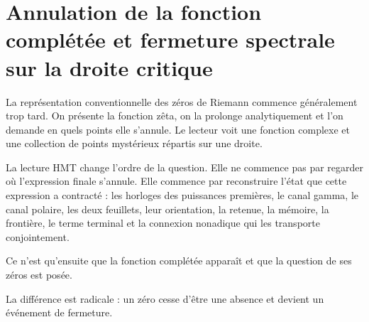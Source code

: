 \section{Annulation de la fonction complétée et fermeture spectrale sur la droite critique}
La représentation conventionnelle des zéros de Riemann commence généralement trop tard. On présente la fonction zêta, on la prolonge analytiquement et l’on demande en quels points elle s’annule. Le lecteur voit une fonction complexe et une collection de points mystérieux répartis sur une droite.\par
La lecture HMT change l’ordre de la question. Elle ne commence pas par regarder où l’expression finale s’annule. Elle commence par reconstruire l’état que cette expression a contracté : les horloges des puissances premières, le canal gamma, le canal polaire, les deux feuillets, leur orientation, la retenue, la mémoire, la frontière, le terme terminal et la connexion nonadique qui les transporte conjointement.\par
Ce n’est qu’ensuite que la fonction complétée apparaît et que la question de ses zéros est posée.\par
La différence est radicale : un zéro cesse d’être une absence et devient un événement de fermeture.\par
{}

